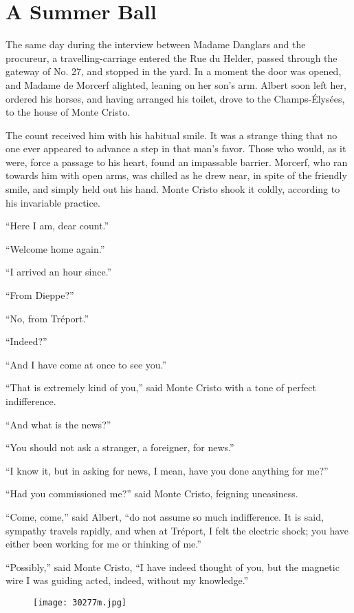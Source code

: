 \chapter{A Summer Ball}

The same day during the interview between Madame Danglars and the
procureur, a travelling-carriage entered the Rue du Helder, passed
through the gateway of No. 27, and stopped in the yard. In a moment the
door was opened, and Madame de Morcerf alighted, leaning on her son’s
arm. Albert soon left her, ordered his horses, and having arranged his
toilet, drove to the Champs-Élysées, to the house of Monte Cristo.

The count received him with his habitual smile. It was a strange thing
that no one ever appeared to advance a step in that man’s favor. Those
who would, as it were, force a passage to his heart, found an
impassable barrier. Morcerf, who ran towards him with open arms, was
chilled as he drew near, in spite of the friendly smile, and simply
held out his hand. Monte Cristo shook it coldly, according to his
invariable practice.

“Here I am, dear count.”

“Welcome home again.”

“I arrived an hour since.”

“From Dieppe?”

“No, from Tréport.”

“Indeed?”

“And I have come at once to see you.”

“That is extremely kind of you,” said Monte Cristo with a tone of
perfect indifference.

“And what is the news?”

“You should not ask a stranger, a foreigner, for news.”

“I know it, but in asking for news, I mean, have you done anything for
me?”

“Had you commissioned me?” said Monte Cristo, feigning uneasiness.

“Come, come,” said Albert, “do not assume so much indifference. It is
said, sympathy travels rapidly, and when at Tréport, I felt the
electric shock; you have either been working for me or thinking of me.”

“Possibly,” said Monte Cristo, “I have indeed thought of you, but the
magnetic wire I was guiding acted, indeed, without my knowledge.”

\begin{figure}[ht]
\texttt{[image: 30277m.jpg]}
\end{figure}

